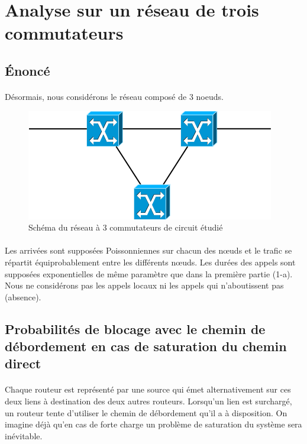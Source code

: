     \section{Analyse sur un réseau de trois commutateurs}
%
        \subsection{Énoncé}
%
            \paragraph{}
Désormais, nous considérons le réseau composé de 3 noeuds.
%
            \begin{figure}[h]
                \centering
                \includegraphics[scale=0.6]{RSC/1-2.png}
                \caption{ Schéma du réseau à 3 commutateurs de circuit étudié }
                \label{ Schema du reseau a 3 commutateurs de circuit }
            \end{figure}
%
            \paragraph{}
Les arrivées sont supposées Poissonniennes sur chacun des nœuds et le trafic se répartit équiprobablement entre les différents nœuds.
Les durées des appels sont supposées exponentielles de même paramètre que dans la première partie (1-a).
Nous ne considérons pas les appels locaux ni les appels qui n'aboutissent pas (absence).
%
%
    \clearpage
%
%
        \subsection{Probabilités de blocage avec le chemin de débordement en cas de saturation du chemin direct}
%
            \paragraph{}
Chaque routeur est représenté par une source qui émet alternativement sur ces deux liens à destination des deux autres routeurs. Lorsqu'un lien est surchargé, un routeur tente d'utiliser le chemin de débordement qu'il a à disposition.
On imagine déjà qu'en cas de forte charge un problème de saturation du système sera inévitable.
%
